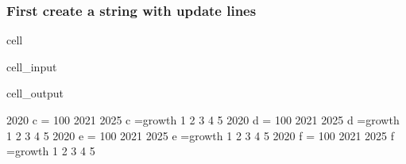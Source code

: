 \documentclass[letterpaper,10pt,english]{jupyterBook}
\begin{document}
\subsubsection{First create a string with update lines}
\label{\detokenize{content/howto/update/model update:first-create-a-string-with-update-lines}}
\begin{sphinxuseclass}{cell}\begin{sphinxVerbatimInput}

\begin{sphinxuseclass}{cell_input}
\begin{sphinxVerbatim}[commandchars=\\\{\}]
                                 
 \PYG{p}{[}
        \PYG{p}{]}
\end{sphinxVerbatim}

\end{sphinxuseclass}\end{sphinxVerbatimInput}
\begin{sphinxVerbatimOutput}

\begin{sphinxuseclass}{cell_output}
\begin{sphinxVerbatim}[commandchars=\\\{\}]
\PYGZlt{}2020     \PYGZgt{} c = 100 
      \PYGZlt{}2021 2025\PYGZgt{} c =growth 1 2 3 4 5
\PYGZlt{}2020     \PYGZgt{} d = 100 
      \PYGZlt{}2021 2025\PYGZgt{} d =growth 1 2 3 4 5
\PYGZlt{}2020     \PYGZgt{} e = 100 
      \PYGZlt{}2021 2025\PYGZgt{} e =growth 1 2 3 4 5
\PYGZlt{}2020     \PYGZgt{} f = 100 
      \PYGZlt{}2021 2025\PYGZgt{} f =growth 1 2 3 4 5
\end{sphinxVerbatim}

\end{sphinxuseclass}\end{sphinxVerbatimOutput}

\end{sphinxuseclass}
\end{document}
